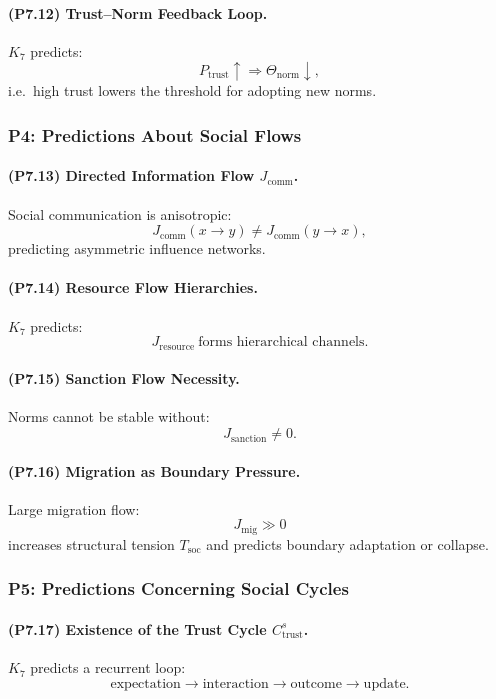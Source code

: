 \paragraph{(P7.12) Trust–Norm Feedback Loop.}
$K_7$ predicts:
\[
P_{\mathrm{trust}} \uparrow \Rightarrow \Theta_{\mathrm{norm}} \downarrow,
\]
i.e.\ high trust lowers the threshold for adopting new norms.

\subsubsection{P4: Predictions About Social Flows}

\paragraph{(P7.13) Directed Information Flow $J_{\mathrm{comm}}$.}
Social communication is anisotropic:
\[
J_{\mathrm{comm}}(x \to y) \neq J_{\mathrm{comm}}(y \to x),
\]
predicting asymmetric influence networks.

\paragraph{(P7.14) Resource Flow Hierarchies.}
$K_7$ predicts:
\[
J_{\mathrm{resource}} \ \text{forms hierarchical channels}.
\]

\paragraph{(P7.15) Sanction Flow Necessity.}
Norms cannot be stable without:
\[
J_{\mathrm{sanction}} \neq 0.
\]

\paragraph{(P7.16) Migration as Boundary Pressure.}
Large migration flow:
\[
J_{\mathrm{mig}} \gg 0
\]
increases structural tension $T_{\mathrm{soc}}$ and predicts boundary adaptation or collapse.

\subsubsection{P5: Predictions Concerning Social Cycles}

\paragraph{(P7.17) Existence of the Trust Cycle $C_{\mathrm{trust}}^s$.}
$K_7$ predicts a recurrent loop:
\[
\text{expectation} \to \text{interaction} \to \text{outcome} \to \text{update}.
\]

